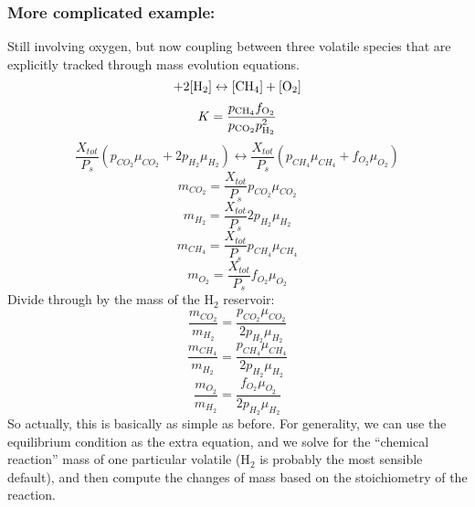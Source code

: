 \subsubsection{More complicated example:}
Still involving oxygen, but now coupling between three volatile species that are explicitly tracked through mass evolution equations.
\begin{equation}
    [\rm{CO}_2] + 2[\rm{H}_2] \leftrightarrow [\rm{CH}_4] + [\rm{O}_2]
    \label{eq:reactionCO2}
\end{equation}
\begin{equation}
K = \frac{p_{{\rm CH}_4} f_{\rm O_2}}{p_{{\rm CO}_2} p_{\rm H_2}^2}
\end{equation}
\begin{equation}
    \frac{X_{tot}}{P_s} \left( p_{CO_2} \mu_{CO_2} + 2 p_{H_2} \mu_{H_2} \right)  \leftrightarrow \frac{X_{tot}}{P_s} \left( p_{CH_4} \mu_{CH_4} + f_{O_2} \mu_{O_2} \right)
    \label{eq:reaction_mass_complicated}
\end{equation}
\begin{equation}
m_{CO_2} = \frac{X_{tot}}{P_s} p_{CO_2} \mu_{CO_2}
\end{equation}
\begin{equation}
m_{H_2} = \frac{X_{tot}}{P_s} 2 p_{H_2} \mu_{H_2}
\end{equation}
\begin{equation}
m_{CH_4} = \frac{X_{tot}}{P_s} p_{CH_4} \mu_{CH_4}
\end{equation}
\begin{equation}
m_{O_2} = \frac{X_{tot}}{P_s} f_{O_2} \mu_{O_2}
\end{equation}
Divide through by the mass of the H$_2$ reservoir:
\begin{equation}
\frac{m_{CO_2}}{m_{H_2}} = \frac{p_{CO_2} \mu_{CO_2}}{2 p_{H_2} \mu_{H_2} }
\end{equation}
\begin{equation}
\frac{m_{CH_4}}{m_{H_2}} = \frac{p_{CH_4} \mu_{CH_4}}{2 p_{H_2} \mu_{H_2} }
\end{equation}
\begin{equation}
\frac{m_{O_2}}{m_{H_2}} = \frac{f_{O_2} \mu_{O_2}}{2 p_{H_2} \mu_{H_2} }
\end{equation}
So actually, this is basically as simple as before.  For generality, we can use the equilibrium condition as the extra equation, and we solve for the ``chemical reaction'' mass of one particular volatile (H$_2$ is probably the most sensible default), and then compute the changes of mass based on the stoichiometry of the reaction.
